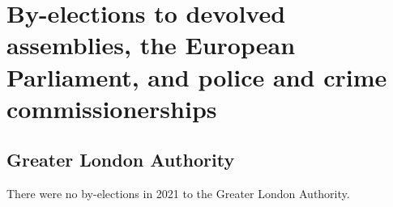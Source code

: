 \documentclass[a4paper,openany]{book}
\begin{document}
%
%
%
%
%
%
%
%
%


\chapter{By-elections to devolved assemblies, the European Parliament, and police and crime commissionerships}

\section{Greater London Authority}

There were no by-elections in 2021 to the Greater London Authority.

\end{document}
